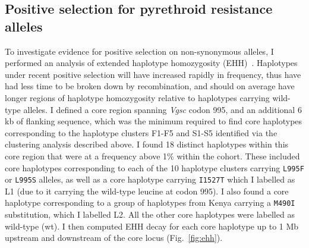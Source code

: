 \documentclass[a4paper,11pt,abstracton,hidelinks]{scrartcl}
\begin{document}
\subsection{Positive selection for pyrethroid resistance alleles}\label{subsec:results-selection}


To investigate evidence for positive selection on non-synonymous alleles, I performed an analysis of extended haplotype homozygosity (EHH)~\parencite{Sabeti2002}.
%
Haplotypes under recent positive selection will have increased rapidly in frequency, thus have had less time to be broken down by recombination, and should on average have longer regions of haplotype homozygosity relative to haplotypes carrying wild-type alleles.
%
I defined a core region spanning \textit{Vgsc} codon 995, and an additional 6 kb of flanking sequence, which was the minimum required to find core haplotypes corresponding to the haplotype clusters F1-F5 and S1-S5 identified via the clustering analysis described above.
%
I found 18 distinct haplotypes within this core region that were at a frequency above 1\% within the cohort.
%
These included core haplotypes corresponding to each of the 10 haplotype clusters carrying \texttt{L995F} or \texttt{L995S} alleles, as well as a core haplotype carrying \texttt{I1527T} which I labelled as L1 (due to it carrying the wild-type leucine at codon 995).
%
I also found a core haplotype corresponding to a group of haplotypes from Kenya carrying a \texttt{M490I} substitution, which I labelled L2.
%
All the other core haplotypes were labelled as wild-type (wt).
%
I then computed EHH decay for each core haplotype up to 1 Mb upstream and downstream of the core locus (Fig.~\ref{fig:ehh}).
\end{document}
